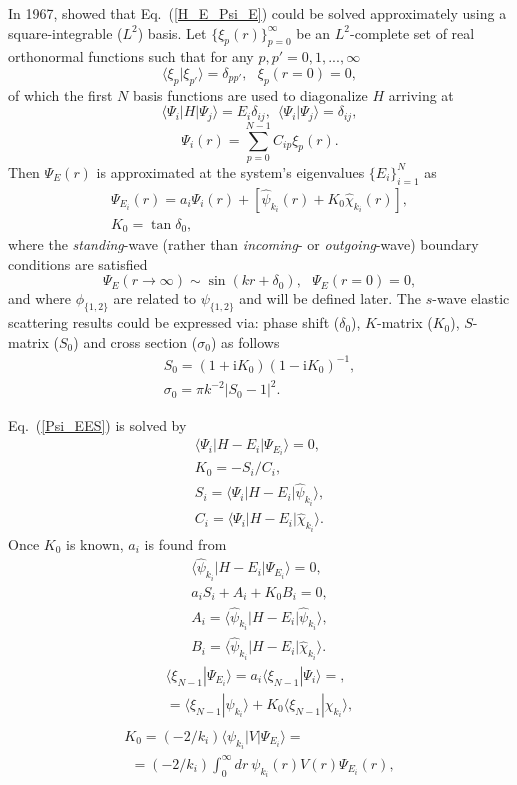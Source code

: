\documentclass[aip
, pra
, showpacs
, aps
, twocolumn
, groupedaddress
, floatfix
]{revtex4}
\newcommand{\beq}{\begin{equation}}
\newcommand{\eeq}{\end{equation}}
\newcommand{\barr}{\begin{array}}
\newcommand{\earr}{\end{array}}
\begin{document}
In 1967, \citet{Harris67} showed that Eq.~(\ref{H_E_Psi_E}) could be solved
approximately using a square-integrable ($L^2$) basis.
Let $\{\xi_p(r)\}_{p=0}^\infty$ be an $L^2$-complete set of real orthonormal functions
such that for any $p,p'=0,1,...,\infty$
\beq
\langle \xi_p | \xi_{p'} \rangle=\delta_{pp'}, \ \ \ \xi_p(r=0)=0,
\eeq
of which the first $N$ basis functions are used to diagonalize $H$ arriving at
\beq
\langle \Psi_i |H| \Psi_j \rangle = E_i \delta_{ij} , \ \ \langle \Psi_i | \Psi_j \rangle=\delta_{ij},
\eeq
\beq
\Psi_i(r) = \sum_{p=0}^{N-1} C_{ip} \xi_p(r).
\eeq
Then $\Psi_E(r)$ is approximated at the system's eigenvalues $\{E_i\}_{i=1}^{N}$ as
\cite{Harris67}
\beq \barr{l}
\Psi_{E_i}(r) = a_i \Psi_i(r)  + [\hat{\psi}_{k_i}(r)  + K_0 \hat{\chi}_{k_i}(r)],\\
K_0 = \tan{\delta_0},
\earr \label{Psi_EES} \eeq
where the {\em standing}-wave (rather than {\em incoming}- or {\em outgoing}-wave) boundary conditions are satisfied
\beq
\Psi_E(r \rightarrow \infty) \sim \sin(kr+\delta_0), \ \ \ \Psi_E(r= 0)=0,
\eeq
and where $\phi_{\{1,2\}}$ are related to $\psi_{\{1,2\}}$ and will be defined later.
The $s$-wave elastic scattering results could be expressed via:
phase shift ($\delta_0$), $K$-matrix ($K_0$), $S$-matrix ($S_{0}$) and cross section ($\sigma_{0}$)
as follows
\beq \barr{l}
S_{0}=(1+\mbox{i}K_0)(1-\mbox{i}K_0)^{-1}, \\
\sigma_{0}=\pi k^{-2} |S_{0}-1|^2.
\earr \eeq


Eq.~(\ref{Psi_EES}) is solved by
\beq \barr{l}
\langle\Psi_i|H-E_i|\Psi_{E_i}\rangle=0,\\
K_0 = - S_i / C_i, \\
S_i = \langle\Psi_i|H-E_i|  \hat{\psi}_{k_i} \rangle, \\
C_i = \langle\Psi_i|H-E_i|  \hat{\chi}_{k_i} \rangle.
\earr \eeq
Once $K_0$ is known, $a_i$ is found from 
\beq \barr{l}
\langle \hat{\psi}_{k_i} |H-E_i| \Psi_{E_i}\rangle=0,\\
a_i S_i + A_i + K_0 B_i = 0,\\  
A_i = \langle \hat{\psi}_{k_i} |H-E_i|  \hat{\psi}_{k_i} \rangle, \\
B_i = \langle \hat{\psi}_{k_i} |H-E_i|  \hat{\chi}_{k_i} \rangle.
\earr \eeq
\beq \barr{l}
\langle \xi_{N-1} | \Psi_{E_i}\rangle
= a_i \langle \xi_{N-1}| \Psi_i \rangle = ,\\
=  \langle \xi_{N-1}| \psi_{k_i} \rangle 
+ K_0 \langle \xi_{N-1}| \chi_{k_i} \rangle ,\\
\earr \eeq
\beq \barr{l}
K_0 = (-2/k_i) \langle \psi_{k_i} | V | \Psi_{E_i} \rangle =\\
\ \ = (-2/k_i) \int_0^\infty  dr\ \psi_{k_i}(r) V(r) \Psi_{E_i}(r),
\earr \eeq
\end{document}
